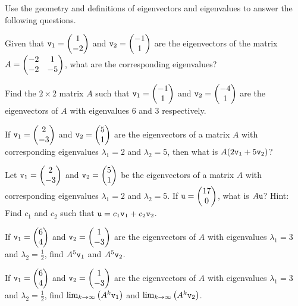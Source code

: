 % 
\begin{problem}
    Use the geometry and definitions of eigenvectors and eigenvalues to answer the
    following questions.
    \ba
        \item Given that $\texttt{v}_1 = \begin{pmatrix} 1 \\ -2 \end{pmatrix}$ and $\texttt{v}_2 = \begin{pmatrix} -1 \\ 1 \end{pmatrix}$ are
            the eigenvectors of the matrix $A = \begin{pmatrix} -2 & 1 \\ -2 & -5 \end{pmatrix}$, what are the
            corresponding eigenvalues?
        \item Find the $2 \times 2$ matrix $A$ such that $\texttt{v}_1 = \begin{pmatrix} -1 \\ 1 \end{pmatrix}$ and
            $\texttt{v}_2 = \begin{pmatrix} -4 \\ 1 \end{pmatrix}$ are the eigenvectors of $A$ with eigenvalues $6$
            and $3$ respectively.
        \item If $\texttt{v}_1 = \begin{pmatrix} 2 \\ -3 \end{pmatrix}$ and $\texttt{v}_2 = \begin{pmatrix} 5 \\ 1 \end{pmatrix}$ are the
            eigenvectors of a matrix $A$ with corresponding eigenvalues $\lambda_1 = 2$
            and $\lambda_2 = 5$, then what is $A(2\texttt{v}_1 + 5\texttt{v}_2)$?
        \item Let $\texttt{v}_1 = \begin{pmatrix} 2 \\ -3 \end{pmatrix}$ and $\texttt{v}_2 = \begin{pmatrix} 5 \\ 1 \end{pmatrix}$ be the
            eigenvectors of a matrix $A$ with corresponding eigenvalues $\lambda_1 = 2$
            and $\lambda_2 = 5$.  If $\texttt{u} = \begin{pmatrix} 17 \\ 0 \end{pmatrix}$, what is $A\texttt{u}$? Hint:
            Find $c_1$ and $c_2$ such that $\texttt{u} = c_1 \texttt{v}_1 + c_2 \texttt{v}_2$.
        \item If $\texttt{v}_1 = \begin{pmatrix} 6 \\ 4 \end{pmatrix}$ and $\texttt{v}_2 = \begin{pmatrix} 1 \\ -3 \end{pmatrix}$ are the
            eigenvectors of $A$ with eigenvalues $\lambda_1 = 3$ and $\lambda_2 =
            \frac{1}{2}$,
            find $A^5 \texttt{v}_1$ and $A^5 \texttt{v}_2$.
        \item If $\texttt{v}_1 = \begin{pmatrix} 6 \\ 4 \end{pmatrix}$ and $\texttt{v}_2 = \begin{pmatrix} 1 \\ -3 \end{pmatrix}$ are the
            eigenvectors of $A$ with eigenvalues $\lambda_1 = 3$ and $\lambda_2 =
            \frac{1}{2}$,
            find $\lim_{k \to \infty} \left( A^k \texttt{v}_1 \right)$ and $\lim_{k\to \infty}
            \left( A^k \texttt{v}_2 \right)$.
    \ea

\end{problem}


